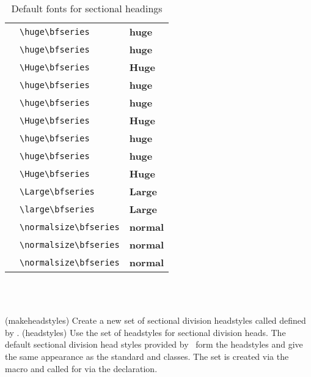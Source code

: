 \begin{table}
\centering
\caption{Default fonts for sectional headings}\label{tab:secfonts}
\begin{tabular}{lll} \toprule
\cmd{\booknamefont}       & \verb?\huge\bfseries? & \huge\bfseries huge \\
\cmd{\booknumfont}        & \verb?\huge\bfseries? & \huge\bfseries huge \\
\cmd{\booktitlefont}      & \verb?\Huge\bfseries? & \Huge\bfseries Huge \\
\cmd{\partnamefont}       & \verb?\huge\bfseries? & \huge\bfseries huge \\
\cmd{\partnumfont}        & \verb?\huge\bfseries? & \huge\bfseries huge \\
\cmd{\parttitlefont}      & \verb?\Huge\bfseries? & \Huge\bfseries Huge \\
\cmd{\chapnamefont}       & \verb?\huge\bfseries? & \huge\bfseries huge \\
\cmd{\chapnumfont}        & \verb?\huge\bfseries? & \huge\bfseries huge \\
\cmd{\chaptitlefont}      & \verb?\Huge\bfseries? & \Huge\bfseries Huge \\
\cmd{\secheadstyle}       & \verb?\Large\bfseries? & \Large\bfseries Large \\
\cmd{\subsecheadstyle}    & \verb?\large\bfseries? & \Large\bfseries Large \\
\cmd{\subsubsecheadstyle} & \verb?\normalsize\bfseries? & \bfseries normal \\
\cmd{\paraheadstyle}      & \verb?\normalsize\bfseries? & \bfseries normal \\
\cmd{\subparaheadstyle}   & \verb?\normalsize\bfseries? & \bfseries normal \\
\bottomrule
\end{tabular}
\end{table}

\begin{syntax}
\cmd{\makeheadstyles} \\
\cmd{\headstyles} \\
\end{syntax}
\glossary(makeheadstyles)%
  {}%
  {Create a new set of sectional division headstyles called 
   defined by .}
\glossary(headstyles)%
  {}%
  {Use the  set of headstyles for sectional division heads.}
The default sectional division head styles provided by \Mname\ form the
 headstyles and give the same appearance as the standard
 and  classes. The set is created via the
\cmd{\makeheadstyles} macro and called for via the 
declaration.
\begin{lcode}
\end{lcode}

